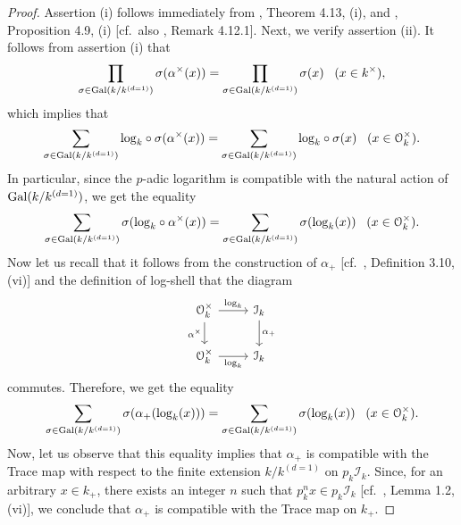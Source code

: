\documentclass[11pt,showkeys]{article}
\theoremstyle{theorem}
\theoremstyle{definition}
\def\CalI{{\mathcal I}}
\begin{document}
\begin{proof}
Assertion (i) follows immediately from \cite{Hoshi2}, Theorem 4.13, (i), and \cite{Hoshi2}, Proposition 4.9, (i) [cf.\ also \cite{Hoshi2}, Remark 4.12.1]. Next, we verify assertion (ii). It follows from assertion (i) that 
\[
\prod_{\sigma \in {\rm Gal} (k/ k^{(d=1)})} \sigma(\alpha^\times(x)) = \prod_{\sigma \in {\rm Gal} (k/ k^{(d=1)})} \sigma(x) \;\;\; (x \in k^{\times}), 
\] 
which implies that 
\[
\sum_{\sigma \in {\rm Gal} (k/ k^{(d=1)})} {\rm log}_k\circ \sigma(\alpha^\times(x)) = \sum_{\sigma \in {\rm Gal} (k/ k^{(d=1)})} {\rm log}_k\circ \sigma(x) \;\;\; (x \in \mathcal{O}_k^\times). 
\] 
In particular, since the $p$-adic logarithm is compatible with the natural action of $ {\rm Gal} (k/ k^{(d=1)})$, we get the equality 
\[
\sum_{\sigma \in {\rm Gal} (k/ k^{(d=1)})} \sigma({\rm log}_k \circ \alpha^\times(x)) = \sum_{\sigma \in {\rm Gal} (k/ k^{(d=1)})} \sigma({\rm log}_k(x)) \;\;\; (x \in \mathcal{O}_k^\times). 
\] 
Now let us recall that it follows from  the construction of $\alpha_+$ [cf.\ \cite{Hoshi1}, Definition 3.10, (vi)] and the definition of log-shell that the diagram
\[
\begin{tikzcd}
\mathcal{O}_k^{\times} \arrow[r, "{\rm log}_k"] \arrow[d, "\alpha^{\times}"'] & \CalI_k \arrow[d, "\alpha_{+}"] \\
\mathcal{O}_k^{\times} \arrow[r, "{\rm log}_k"']                              & \CalI_k             
\end{tikzcd}
\]
commutes. Therefore, we get the equality 
\[
\sum_{\sigma \in {\rm Gal} (k/ k^{(d=1)})} \sigma(\alpha_{+}({\rm log}_k(x))) = \sum_{\sigma \in {\rm Gal} (k/ k^{(d=1)})} \sigma({\rm log}_k(x)) \;\;\; (x \in \mathcal{O}_k^\times).
\] 
Now, let us observe that this equality implies that $\alpha_{+}$ is compatible with the Trace map with respect to the finite extension $k/k^{(d=1)}$ on $p_k \mathcal{I}_k$. 
Since, for an arbitrary $x \in k_+$, there exists an integer $n$ such that $p_k^{n}x \in p_k \mathcal{I}_k$ [cf.\ \cite{Hoshi1}, Lemma 1.2, (vi)], we conclude that $\alpha_{+} $ is compatible with the Trace map on $k_{+}$. 
\end{proof}
\end{document}
